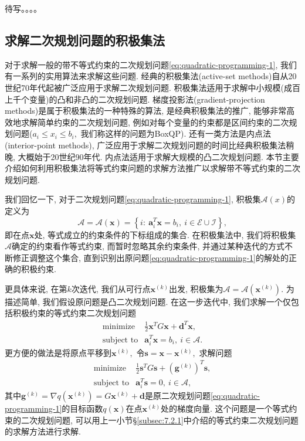 \documentclass{SBCbookchapter}
\newcommand{\V}[1]{{\bm{#1}}}
\numberwithin{equation}{section}
\begin{document}
待写。。。。


\subsection{求解二次规划问题的积极集法}
\label{subsec:7.2.2}

对于求解一般的带不等式约束的二次规划问题\eqref{eq:quadratic-programming-1}, 我们有一系列的实用算法来求解这些问题. 经典的积极集法(active-set methods)自从20世纪70年代起被广泛应用于求解二次规划问题. 积极集法适用于求解中小规模(成百上千个变量)的凸和非凸的二次规划问题. 梯度投影法(gradient-projection methods)是属于积极集法的一种特殊的算法, 是经典积极集法的推广, 能够非常高效地求解简单约束的二次规划问题, 例如对每个变量的约束都是区间约束的二次规划问题($a_i \leqslant x_i \leqslant b_i,$ 我们称这样的问题为BoxQP). 还有一类方法是内点法(interior-point methods), 广泛应用于求解二次规划问题的时间比经典积极集法稍晚, 大概始于20世纪90年代. 内点法适用于求解大规模的凸二次规划问题. 本节主要介绍如何利用积极集法将等式约束问题的求解方法推广以求解带不等式约束的二次规划问题.

我们回忆一下, 对于二次规划问题\eqref{eq:quadratic-programming-1}, 积极集$\mathcal{A}(x)$的定义为
\begin{equation}
\label{eq:qp-active-set}
\mathcal{A} = \mathcal{A}(\V{x}) = \left\{ i : ~ \V{a}_i^T \V{x} = b_i, ~ i \in \mathcal{E} \cup \mathcal{I} \right\},
\end{equation}
即在点$\V{x}$处, 等式成立的约束条件的下标组成的集合. 在积极集法中, 我们将积极集$\mathcal{A}$确定的约束看作等式约束, 而暂时忽略其余约束条件, 并通过某种迭代的方式不断修正调整这个集合, 直到识别出原问题\eqref{eq:quadratic-programming-1}的解处的正确的积极约束.

更具体来说, 在第$k$次迭代, 我们从可行点$\V{x}^{(k)}$出发, 积极集为$\mathcal{A} = \mathcal{A}(\V{x}^{(k)}).$ 为描述简单, 我们假设原问题是凸二次规划问题. 在这一步迭代中, 我们求解一个仅包括积极约束的等式约束二次规划问题
\begin{equation}
\label{eq:qp-active-set-1}
\begin{array}{cl}
\text{minimize} & \frac{1}{2} \V{x}^T G \V{x} + \V{d}^T \V{x}, \\
\text{subject to} & \V{a}_i^T \V{x} = b_i, ~ i \in \mathcal{A}.
\end{array}
\end{equation}
更方便的做法是将原点平移到$\V{x}^{(k)},$ 令$\V{s} = \V{x} - \V{x}^{(k)},$ 求解问题
\begin{equation}
\label{eq:qp-active-set-2}
\begin{array}{cl}
\text{minimize} & \frac{1}{2} \V{s}^T G \V{s} + (\V{g}^{(k)})^T \V{s}, \\
\text{subject to} & \V{a}_i^T \V{s} = 0, ~ i \in \mathcal{A},
\end{array}
\end{equation}
其中$\V{g}^{(k)} = \nabla q(\V{x}^{(k)}) = G \V{x}^{(k)} + \V{d}$是原二次规划问题\eqref{eq:quadratic-programming-1}的目标函数$q(\V{x})$在点$\V{x}^{(k)}$处的梯度向量. 这个问题是一个等式约束的二次规划问题, 可以用上一小节\S\ref{subsec:7.2.1}中介绍的等式约束二次规划问题的求解方法进行求解.
\end{document}
